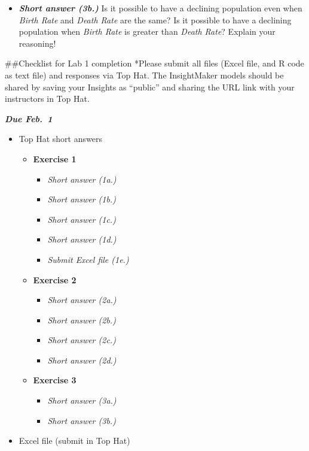 \documentclass[
]{article}
\providecommand{\tightlist}{%
  \setlength{\itemsep}{0pt}\setlength{\parskip}{0pt}}
\begin{document}
\begin{itemize}
\tightlist
\item
  \textbf{\emph{Short answer (3b.)}} Is it possible to have a declining
  population even when \emph{Birth Rate} and \emph{Death Rate} are the
  same? Is it possible to have a declining population when \emph{Birth
  Rate} is greater than \emph{Death Rate}? Explain your reasoning!
\end{itemize}

\#\#Checklist for Lab 1 completion *Please submit all files (Excel file,
and R code as text file) and responses via Top Hat. The InsightMaker
models should be shared by saving your Insights as ``public'' and
sharing the URL link with your instructors in Top Hat.

\textbf{\emph{Due Feb.~1}}

\begin{itemize}
\tightlist
\item
  Top Hat short answers

  \begin{itemize}
  \tightlist
  \item
    \textbf{Exercise 1}

    \begin{itemize}
    \tightlist
    \item
      \emph{Short answer (1a.)}
    \item
      \emph{Short answer (1b.)}
    \item
      \emph{Short answer (1c.)}
    \item
      \emph{Short answer (1d.)}
    \item
      \emph{Submit Excel file (1e.)}
    \end{itemize}
  \item
    \textbf{Exercise 2}

    \begin{itemize}
    \tightlist
    \item
      \emph{Short answer (2a.)}
    \item
      \emph{Short answer (2b.)}
    \item
      \emph{Short answer (2c.)}
    \item
      \emph{Short answer (2d.)}
    \end{itemize}
  \item
    \textbf{Exercise 3}

    \begin{itemize}
    \tightlist
    \item
      \emph{Short answer (3a.)}
    \item
      \emph{Short answer (3b.)}
    \end{itemize}
  \end{itemize}
\item
  Excel file (submit in Top Hat)


\end{itemize}
\end{document}
